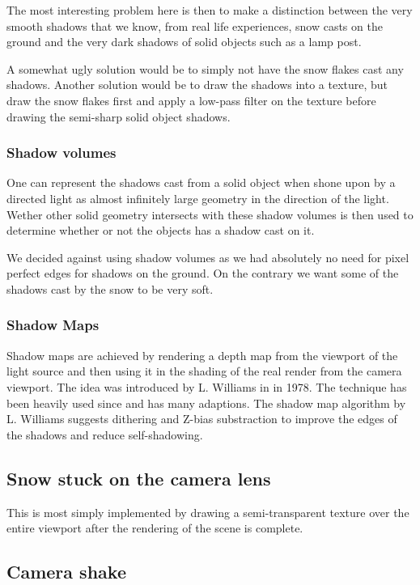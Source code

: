 \documentclass[a4paper,12pt]{article}
\begin{document}
The most interesting problem here is then to make a distinction between the very smooth shadows that we know, from real life experiences, snow casts on the ground and the very dark shadows of solid objects such as a lamp post.

A somewhat ugly solution would be to simply not have the snow flakes cast any shadows. Another solution would be to draw the shadows into a texture, but draw the snow flakes first and apply a low-pass filter on the texture before drawing the semi-sharp solid object shadows.


\subsubsection{Shadow volumes}

One can represent the shadows cast from a solid object when shone upon by a directed light as almost infinitely large geometry in the direction of the light. Wether other solid geometry intersects with these shadow volumes is then used to determine whether or not the objects has a shadow cast on it.

We decided against using shadow volumes as we had absolutely no need for pixel perfect edges for shadows on the ground. On the contrary we want some of the shadows cast by the snow to be very soft.


\subsubsection{Shadow Maps}

Shadow maps are achieved by rendering a depth map from the viewport of the light source and then using it in the shading of the real render from the camera viewport. The idea was introduced by L. Williams in \cite{shadow-maps} in 1978. The technique has been heavily used since and has many adaptions. The shadow map algorithm by L. Williams suggests dithering and Z-bias substraction to improve the edges of the shadows and reduce self-shadowing.

\subsection{Snow stuck on the camera lens}

This is most simply implemented by drawing a semi-transparent texture over the entire viewport after the rendering of the scene is complete.

\subsection{Camera shake}
\end{document}
